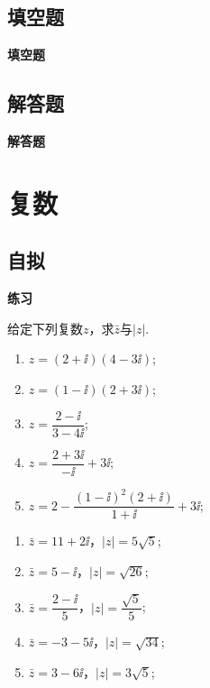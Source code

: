   \subsection{填空题}
  \begin{exercise}{\bf 填空题}
  \end{exercise}
  \subsection{解答题}
  \begin{exercise}{\bf 解答题}
  \end{exercise}
\section{复数}
  \subsection{自拟}\begin{exercise}{\bf 练习}
    \item 给定下列复数$z$，求$\bar z$与$|z|$.
      \begin{enumerate}[label=\arabic*)]
        \item $z=(2+\ii)(4-3\ii)$;
        \vspace{2cm}
        \item $z=(1-\ii)(2+3\ii)$;
        \vspace{2cm}
        \item $z=\dfrac{2-\ii}{3-4\ii}$;
        \vspace{2cm}
        \item $z=\dfrac{2+3\ii}{-\ii}+3\ii$;
        \vspace{2cm}
        \item $z=2-\dfrac{(1-\ii)^2(2+\ii)}{1+\ii}+3\ii$;
        \vspace{2cm}
      \end{enumerate}
      \begin{answer}
        \begin{enumerate}[itemindent=1em,listparindent=6em, label=\arabic*)]
          \item $\bar z=11+2\ii$，$|z|=5\sqrt5$;
          \item $\bar z=5-\ii$，$|z|=\sqrt{26}$;
          \item $\bar z=\dfrac{2-\ii}5$，$|z|=\dfrac{\sqrt5}5$;
          \item $\bar z=-3-5\ii$，$|z|=\sqrt{34}$;
          \item $\bar z=3-6\ii$，$|z|=3\sqrt5$;

\end{enumerate}
\end{answer}
\end{exercise}
